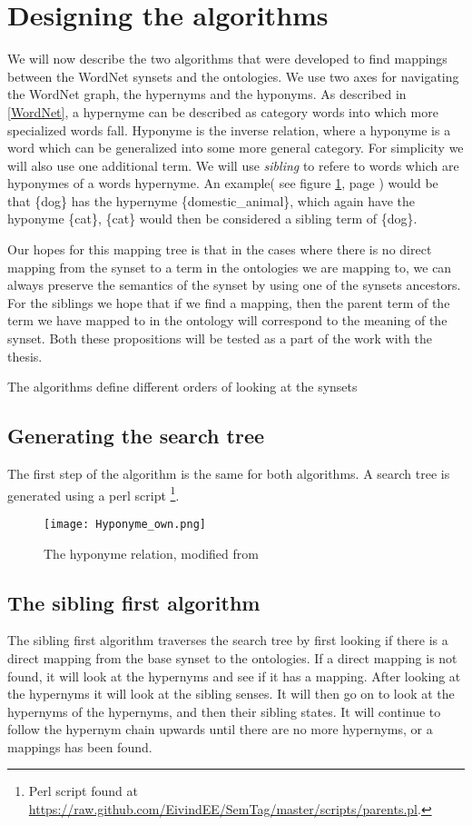 \section{Designing the algorithms}
We will now describe the two algorithms that were developed to find mappings between the WordNet synsets and the ontologies.
We use two axes for navigating the WordNet graph, the hypernyms and the hyponyms.
As described in \ref{WordNet}, a hypernyme can be described as category words into which more specialized words fall.
Hyponyme is the inverse relation, where a hyponyme is a word which can be generalized into some more general category.
For simplicity we will also use one additional term.
We will use \emph{sibling} to refere to words which are hyponymes of a words hypernyme.
An example( see figure \ref{Hyponyme}, page \pageref{Hyponyme})
would be that \{dog\} has the hypernyme \{domestic\_animal\}, which again have the hyponyme \{cat\},
\{cat\} would then be considered a sibling term of \{dog\}.


Our hopes for this mapping tree is that in the cases where there is no direct mapping from the synset to a term in the
ontologies we are mapping to, we can always preserve the semantics of the synset by using one of the synsets ancestors.
For the siblings we hope that if we find a mapping,
then the parent term of the term we have mapped to in the ontology will correspond to the meaning of the synset.
Both these propositions will be tested as a part of the work with the thesis.

The algorithms define different orders of looking at the synsets

\subsection{Generating the search tree}
The first step of the algorithm is the same for both algorithms.
A search tree is generated using a perl script
\footnote{Perl script found at \url{https://raw.github.com/EivindEE/SemTag/master/scripts/parents.pl}.}.

\begin{figure}[ht]
	\begin{center}
		\texttt{[image: Hyponyme\_own.png]}
		\caption{The hyponyme relation, modified from \protect \citet{Miller1990}}
		\label{Hyponyme}
	\end{center}
\end{figure}



\subsection{The sibling first algorithm}
The sibling first algorithm traverses the search tree by first looking if there is a direct mapping from the base synset to the ontologies.
If a direct mapping is not found, it will look at the hypernyms and see if it has a mapping.
After looking at the hypernyms it will look at the sibling senses.
It will then go on to look at the hypernyms of the hypernyms, and then their sibling states.
It will continue to follow the hypernym chain upwards until there are no more hypernyms, or a mappings has been found.

